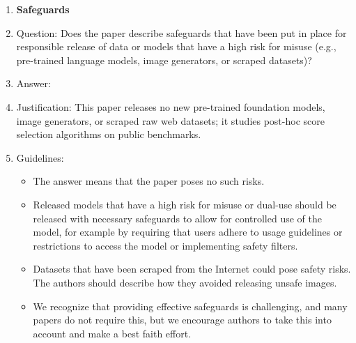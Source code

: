 \documentclass{article}
\theoremstyle{plain}
\theoremstyle{definition}
\theoremstyle{remark}
\begin{document}
\begin{enumerate}
\item {\bf Safeguards}
    \item[] Question: Does the paper describe safeguards that have been put in place for responsible release of data or models that have a high risk for misuse (e.g., pre-trained language models, image generators, or scraped datasets)?
    \item[] Answer: \answerNA{}
    \item[] Justification: This paper releases no new pre-trained foundation models, image generators, or scraped raw web datasets; it studies post-hoc score selection algorithms on public benchmarks.
    \item[] Guidelines:
    \begin{itemize}
        \item The answer \answerNA{} means that the paper poses no such risks.
        \item Released models that have a high risk for misuse or dual-use should be released with necessary safeguards to allow for controlled use of the model, for example by requiring that users adhere to usage guidelines or restrictions to access the model or implementing safety filters.
        \item Datasets that have been scraped from the Internet could pose safety risks. The authors should describe how they avoided releasing unsafe images.
        \item We recognize that providing effective safeguards is challenging, and many papers do not require this, but we encourage authors to take this into account and make a best faith effort.
    \end{itemize}


\end{enumerate}
\end{document}
